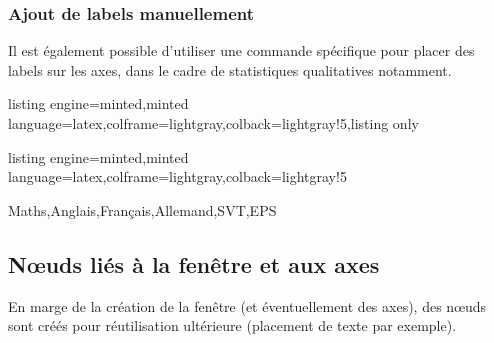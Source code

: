 \documentclass[11pt,a4paper]{ltxdoc}
\begin{document}
\subsubsection{Ajout de labels manuellement}\label{ajoutlabels}

Il est également possible d'utiliser une commande spécifique pour placer des labels sur les axes, dans le cadre de statistiques qualitatives notamment.

\begin{tcblisting}{listing engine=minted,minted language=latex,colframe=lightgray,colback=lightgray!5,listing only}

\end{tcblisting}

\begin{tcblisting}{listing engine=minted,minted language=latex,colframe=lightgray,colback=lightgray!5}
\begin{GraphiqueTikz}%
    [x=1.2cm,y=0.4cm,Xmin=0,Xmax=7,Xgrille=1,
    Ymin=0,Ymax=15,Ygrille=5,Ygrilles=1]
    {Maths,Anglais,Français,Allemand,SVT,EPS}
\end{GraphiqueTikz}
\end{tcblisting}

\pagebreak

\subsection{Nœuds liés à la fenêtre et aux axes}

En marge de la création de la fenêtre (et éventuellement des axes), des nœuds sont créés pour réutilisation ultérieure (placement de texte par exemple).
\end{document}
